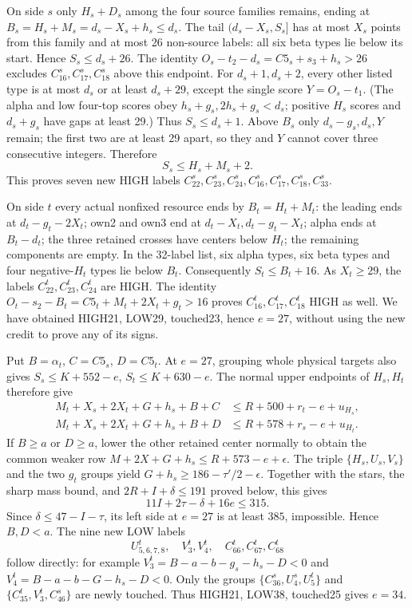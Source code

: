 \documentclass[11pt,letterpaper]{article}
\theoremstyle{definition}\newtheorem{definition}[theorem]{Definition}
\begin{document}
On side $s$ only $H_s+D_s$ among the four source families remains,
ending at $B_s=H_s+M_s=d_s-X_s+h_s\le d_s$.
The tail $(d_s-X_s,S_s]$ has at most $X_s$ points from this family
and at most 26 non-source labels: all six beta types lie below its
start. Hence $S_s\le d_s+26$. The identity
$O_s-t_2-d_s=C5_s+s_3+h_s>26$ excludes
$C_{16}^s,C_{17}^s,C_{18}^s$ above this endpoint.
For $d_s+1,d_s+2$, every other listed type is at most $d_s$ or at
least $d_s+29$, except the single score $Y=O_s-t_1$.
(The alpha and low four-top scores obey $h_s+g_s,2h_s+g_s<d_s$;
positive $H_s$ scores and $d_s+g_s$ have gaps at least 29.)
Thus $S_s\le d_s+1$. Above $B_s$ only $d_s-g_s,d_s,Y$ remain;
the first two are at least 29 apart, so they and $Y$ cannot cover three
consecutive integers. Therefore
\[
 S_s\le H_s+M_s+2.
\]
This proves seven new HIGH labels
$C_{22}^s,C_{23}^s,C_{24}^s,C_{16}^s,C_{17}^s,C_{18}^s,C_{33}^s$.

On side $t$ every actual nonfixed resource ends by
$B_t=H_t+M_t$: the leading ends at $d_t-g_t-2X_t$; own2 and own3
end at $d_t-X_t,d_t-g_t-X_t$; alpha ends at $B_t-d_t$; the three
retained crosses have centers below $H_t$; the remaining components are
empty. In the 32-label list, six alpha types, six beta types and four
negative-$H_t$ types lie below $B_t$. Consequently $S_t\le B_t+16$.
As $X_t\ge29$, the labels $C_{22}^t,C_{23}^t,C_{24}^t$ are HIGH.
The identity $O_t-s_2-B_t=C5_t+M_t+2X_t+g_t>16$ proves
$C_{16}^t,C_{17}^t,C_{18}^t$ HIGH as well.
We have obtained HIGH21, LOW29, touched23, hence $e=27$, without
using the new credit to prove any of its signs.

Put $B=\alpha_t$, $C=C5_s$, $D=C5_t$. At $e=27$, grouping whole
physical targets also gives $S_s\le K+552-e$, $S_t\le K+630-e$.
The normal upper endpoints of $H_s,H_t$ therefore give
\begin{align*}
 M_t+X_s+2X_t+G+h_s+B+C&\le R+500+r_t-e+u_{H_s},\\
 M_t+X_s+2X_t+G+h_s+B+D&\le R+578+r_s-e+u_{H_t}.
\end{align*}
If $B\ge a$ or $D\ge a$, lower the other retained center normally
to obtain the common weaker row
$M+2X+G+h_s\le R+573-e+\epsilon$.
The triple $\{H_s,U_s,V_s\}$ and the two $g_t$ groups yield
$G+h_s\ge186-\tau'/2-\epsilon$.
Together with the stars, the sharp mass bound, and
$2R+I+\delta\le191$ proved below, this gives
\[
 11I+2\tau-\delta+16e\le315.
\]
Since $\delta\le47-I-\tau$, its left side at $e=27$ is at least
$385$, impossible. Hence $B,D<a$.
The nine new LOW labels
\[
 U_{5,6,7,8}^t,\quad V_3^t,V_4^t,\quad C_{66}^t,C_{67}^t,C_{68}^t
\]
follow directly: for example
$V_3^t=B-a-b-g_s-h_s-D<0$ and
$V_4^t=B-a-b-G-h_s-D<0$.
Only the groups $\{C_{36}^s,U_4^s,U_5^t\}$ and
$\{C_{35}^t,V_3^t,C_{46}^s\}$ are newly touched. Thus
HIGH21, LOW38, touched25 gives $e=34$.
\end{document}

